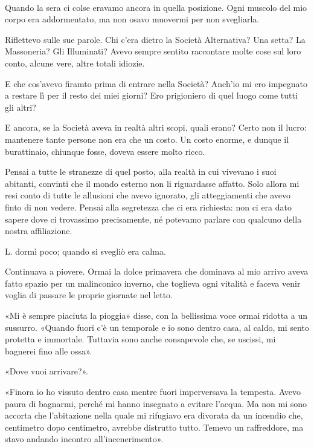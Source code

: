 \documentclass[a4paper,12pt]{book}
\begin{document}
\paragraph{}
Quando la sera ci colse eravamo ancora in quella posizione. Ogni muscolo del
mio corpo era addormentato, ma non osavo muovermi per non svegliarla.

Riflettevo sulle sue parole. Chi c'era dietro la Società Alternativa? Una setta?
La Massoneria? Gli Illuminati? Avevo sempre sentito raccontare molte cose sul
loro conto, alcune vere, altre totali idiozie.

E che cos'avevo firamto prima di entrare nella Società? Anch'io mi ero impegnato
a restare lì per il resto dei miei giorni? Ero prigioniero di quel luogo come
tutti gli altri?

E ancora, se la Società aveva in realtà altri scopi, quali erano? Certo non il
lucro: mantenere tante persone non era che un costo. Un costo enorme, e dunque
il burattinaio, chiunque fosse, doveva essere molto ricco.

Pensai a tutte le stranezze di quel posto, alla realtà in cui vivevano i suoi
abitanti, convinti che il mondo esterno non li riguardasse affatto. Solo allora
mi resi conto di tutte le allusioni che avevo ignorato, gli atteggiamenti che
avevo finto di non vedere. Pensai alla segretezza che ci era richiesta: non ci
era dato sapere dove ci trovassimo precisamente, né potevamo parlare con
qualcuno della nostra affiliazione.

L. dormì poco; quando si svegliò era calma.

Continuava a piovere. Ormai la dolce primavera che dominava al mio arrivo aveva
fatto spazio per un malinconico inverno, che toglieva ogni vitalità e faceva
venir voglia di passare le proprie giornate nel letto.

«Mi è sempre piaciuta la pioggia» disse, con la bellissima voce ormai ridotta
a un sussurro. «Quando fuori c'è un temporale e io sono dentro casa, al caldo,
mi sento protetta e immortale. Tuttavia sono anche consapevole che, se uscissi,
mi bagnerei fino alle ossa».

«Dove vuoi arrivare?».

«Finora io ho vissuto dentro casa mentre fuori imperversava la tempesta. Avevo
paura di bagnarmi, perché mi hanno insegnato a evitare l'acqua. Ma non mi sono
accorta che l'abitazione nella quale mi rifugiavo era divorata da un incendio
che, centimetro dopo centimetro, avrebbe distrutto tutto. Temevo un raffreddore,
ma stavo andando incontro all'incenerimento».
\end{document}
